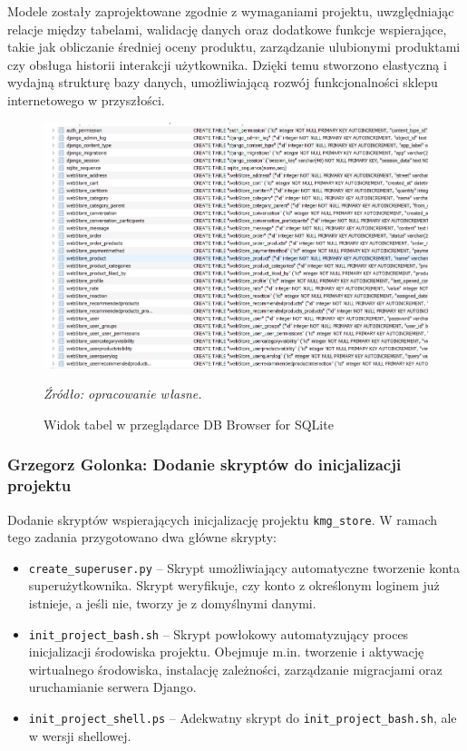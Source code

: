 \documentclass[12pt,a4paper,oneside]{article}
\theoremstyle{definition}
\numberwithin{equation}{section}
\begin{document}
Modele zostały zaprojektowane zgodnie z wymaganiami projektu, uwzględniając relacje między tabelami,
walidację danych oraz dodatkowe funkcje wspierające, takie jak obliczanie średniej oceny produktu,
zarządzanie ulubionymi produktami czy obsługa historii interakcji użytkownika.
Dzięki temu stworzono elastyczną i wydajną strukturę bazy danych,
umożliwiającą rozwój funkcjonalności sklepu internetowego w przyszłości.

\begin{figure}[H]
    \centering
    \includegraphics[width=0.9\columnwidth]{images/krzysztofBImages/modele_bazodanowe.png}
    \caption{Widok tabel w przeglądarce DB Browser for SQLite}
    \emph{Źródło: opracowanie własne.}
    \label{fig:db_models}
\end{figure}


%
%
\subsubsection{Grzegorz Golonka: Dodanie skryptów do inicjalizacji projektu}
\label{section:1.3.21}
Dodanie skryptów wspierających inicjalizację projektu \texttt{kmg\_store}. W ramach tego zadania przygotowano dwa główne skrypty:

\begin{itemize}
    \item \texttt{create\_superuser.py} – Skrypt umożliwiający automatyczne tworzenie konta superużytkownika. Skrypt weryfikuje, czy konto z określonym loginem już istnieje, a jeśli nie, tworzy je z domyślnymi danymi.
    \item \texttt{init\_project\_bash.sh} – Skrypt powłokowy automatyzujący proces inicjalizacji środowiska projektu. Obejmuje m.in. tworzenie i aktywację wirtualnego środowiska, instalację zależności, zarządzanie migracjami oraz uruchamianie serwera Django.
    \item \texttt{init\_project\_shell.ps} – Adekwatny skrypt do \texttt{init\_project\_bash.sh}, ale w wersji shellowej.
\end{itemize}
\end{document}
